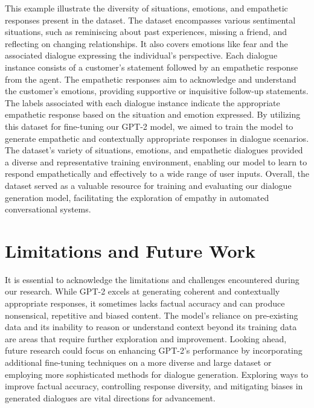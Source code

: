 \documentclass[12pt]{IEEEtran}
\begin{document}
This example illustrate the diversity of situations, emotions, and empathetic responses present in the dataset. The dataset encompasses various sentimental situations, such as reminiscing about past experiences, missing a friend, and reflecting on changing relationships. It also covers emotions like fear and the associated dialogue expressing the individual's perspective. Each dialogue instance consists of a customer's statement followed by an empathetic response from the agent. The empathetic responses aim to acknowledge and understand the customer's emotions, providing supportive or inquisitive follow-up statements. The labels associated with each dialogue instance indicate the appropriate empathetic response based on the situation and emotion expressed. By utilizing this dataset for fine-tuning our GPT-2 model, we aimed to train the model to generate empathetic and contextually appropriate responses in dialogue scenarios. The dataset's variety of situations, emotions, and empathetic dialogues provided a diverse and representative training environment, enabling our model to learn to respond empathetically and effectively to a wide range of user inputs.
Overall, the dataset served as a valuable resource for training and evaluating our dialogue generation model, facilitating the exploration of empathy in automated conversational systems.

\section{Limitations and Future Work}
It is essential to acknowledge the limitations and challenges encountered during our research. While GPT-2 excels at generating coherent and contextually appropriate responses, it sometimes lacks factual accuracy and can produce nonsensical, repetitive and biased content. The model's reliance on pre-existing data and its inability to reason or understand context beyond its training data are areas that require further exploration and improvement. Looking ahead, future research could focus on enhancing GPT-2's performance by incorporating additional fine-tuning techniques on a more diverse and large dataset or employing more sophisticated methods for dialogue generation. Exploring ways to improve factual accuracy, controlling response diversity, and mitigating biases in generated dialogues are vital directions for advancement.
\end{document}

